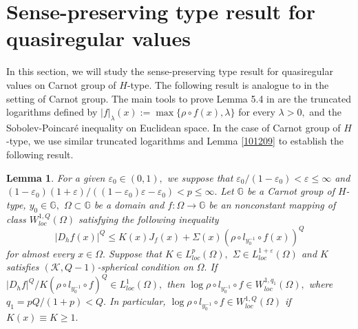 \documentclass[11pt,twoside]{article}
\newtheorem{lem}[thm]{Lemma}
\theoremstyle{definition}
\theoremstyle{remark}
\begin{document}
\section{Sense-preserving type result for quasiregular values}\label{sec6}
In this section, we will study the sense-preserving type result for quasiregular values on Carnot group of $H$-type. The following result is analogue to \cite[Lemma 5.4]{KO221} in the setting of Carnot group. The main tools to prove Lemma 5.4  in \cite{KO221} are the truncated logarithms defined by $\vert f\vert_{\lambda}(x):=\max\{\rho\circ f( x),\lambda\}$ for every $\lambda>0,$ and the Sobolev-Poincar\'{e} inequality on Euclidean space. In the case of Carnot group of $H$-type, we use similar truncated logarithms and Lemma \ref{101209}
 to establish the following result.
\begin{lem} \label{lemma3522}
For a given $\varepsilon_{0}\in(0,1),$ we suppose that $\varepsilon_{0}/(1-\varepsilon_{0})<\varepsilon\leq\infty$ and $(1-\varepsilon_{0})(1+\varepsilon)/((1-\varepsilon_{0})\varepsilon-\varepsilon_{0})<p\leq\infty.$ Let $\mathbb{G}$ be a Carnot group of $H$-type,  $y_{0}\in\mathbb{G},$ $\Omega\subset\mathbb{G}$ be a domain and $f:\Omega\rightarrow \mathbb{G}$ be an nonconstant mapping of class $W_{loc}^{1,Q}(\Omega)$ satisfying  the following inequality
$$\vert D_{h}f(x)\vert^{Q}\leq K(x)J_{f}(x)+\Sigma(x)(\rho\circ l_{y_{0}^{-1}}\circ f(x))^{Q}$$
for almost every $x\in\Omega.$ Suppose that $K\in L_{loc}^{p}(\Omega),$  $\Sigma\in L_{loc}^{1+\varepsilon}(\Omega)$  and $K$ satisfies $(\mathcal{K},Q-1)$-spherical  condition on $\Omega.$ If $\vert D_{h}f\vert^{Q}/K(\rho\circ l_{y_{0}^{-1}}\circ f)^{Q}\in L_{loc}^{1}(\Omega),$
then $\log\rho\circ l_{y_{0}^{-1}}\circ f\in W_{loc}^{1,q_{1}}(\Omega),$ where $q_{1}=pQ/(1+p)<Q.$ In particular, $\log\rho\circ l_{y_{0}^{-1}}\circ f\in W_{loc}^{1,Q}(\Omega)$ if $K(x)\equiv K\geq1.$
\end{lem}
\end{document}
